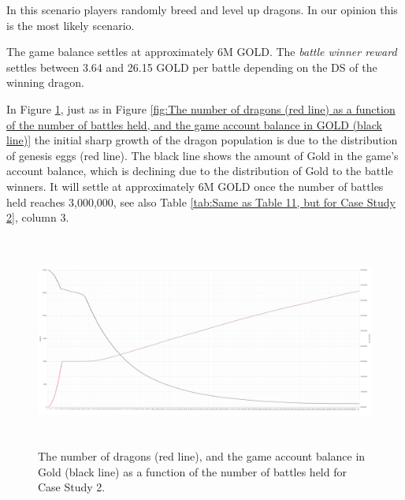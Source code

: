 \documentclass[12pt]{article}
\begin{document}
{\begin{table}[H]
 \end{table}




In this scenario players randomly breed and level up dragons. In our opinion this is the most likely scenario.\par

The game balance settles at approximately 6M GOLD. The \textit{battle winner reward} settles between 3.64 and 26.15 GOLD per battle depending on the DS of the winning dragon.\par

In Figure \ref{fig:CS2The number of dragons (red line) as a function of the number of battles held, and the game account balance in Gold (black line).}, just as in Figure \ref{fig:The number of dragons (red line) as a function of the number of battles held, and the game account balance in GOLD (black line)} the initial sharp growth of the dragon population is due to the distribution of genesis eggs (red line). The black line shows the amount of Gold in the game’s account balance, which is declining due to the distribution of Gold to the battle winners. It will settle at approximately 6M GOLD once the number of battles held reaches 3,000,000, see also  Table \ref{tab:Same as Table 11, but for Case Study 2}, column 3.\par




\begin{figure}[H]
	\begin{Center}
		\includegraphics[width=6.27in,height=2.76in]{./media/CS2nimage30.png}
		\caption{The number of dragons (red line), and the game account balance in Gold (black line) as a function of the number of battles held for Case Study 2.}
		\label{fig:CS2The number of dragons (red line) as a function of the number of battles held, and the game account balance in Gold (black line).}
	\end{Center}
\end{figure}


}
\end{document}
